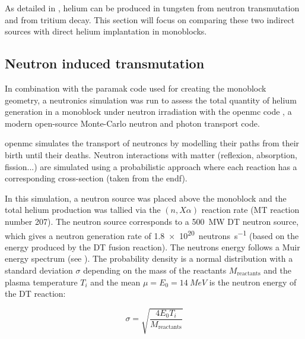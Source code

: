 As detailed in , helium can be produced in tungsten from neutron \gls{transmutation} and from tritium decay.
This section will focus on comparing these two indirect sources with direct helium implantation in \glspl{monoblock}.

\subsection{Neutron induced transmutation}

In combination with the \gls{paramak} code  used for creating the \gls{monoblock} geometry, a neutronics simulation was run to assess the total quantity of helium generation in a \gls{monoblock} under neutron irradiation with the \gls{openmc} code , a modern open-source Monte-Carlo neutron and photon transport code.

\Gls{openmc} simulates the transport of neutroncs by modelling their paths from their birth until their deaths.
Neutron interactions with matter (reflexion, absorption, fission...) are simulated using a probabilistic approach where each reaction has a corresponding cross-section (taken from the \gls{endf}).

In this simulation, a neutron source was placed above the \gls{monoblock} and the total helium production was tallied via the $(n,X\alpha)$ reaction rate (MT reaction number 207).
The neutron source corresponds to a \SI{500}{MW} DT neutron source, which gives a neutron generation rate of \SI{1.8e20}{neutrons.s^{-1}} (based on the energy produced by the DT fusion reaction).
The neutrons energy follows a Muir energy spectrum  (see ).
The probability density is a normal distribution with a standard deviation $\sigma$ depending on the mass of the reactants $M_\mathrm{reactants}$ and the \gls{plasma} temperature $T_i$ and the mean $\mu=E_0= \SI{14}{MeV}$ is the neutron energy of the DT reaction:

\begin{equation}
    \sigma = \sqrt{\frac{4 E_0 T_i}{M_\mathrm{reactants}}}
\end{equation}

